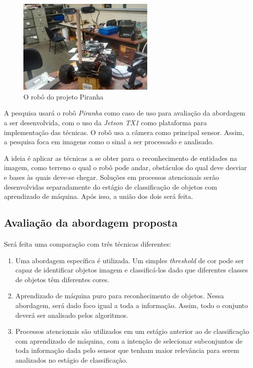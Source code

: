 \documentclass[10pt]{article}
\newcommand{\tit}[1]{\textit{#1}}
\begin{document}
\begin{figure}[H]
  		\centering
    	\includegraphics[width=0.6\textwidth]{imgs/piranha.jpg}
		\caption[9pt]{O robô do projeto Piranha}
\end{figure}

A pesquisa usará o robô \tit{Piranha} como caso de uso para
avaliação da abordagem a ser desenvolvida, com o uso da \tit{Jetson TX1} 
como plataforma para implementação das técnicas.
O robô usa a câmera como principal sensor.
Assim, a pesquisa foca em imagens como o sinal a ser processado e analisado. 

A ideia é aplicar as técnicas a se obter para o reconhecimento
de entidades na imagem, como terreno o qual o robô pode andar, obstáculos do
qual deve desviar e bases às quais deve-se chegar.
Soluções em processos atencionais serão desenvolvidas separadamente do
estágio de classificação de objetos com aprendizado de máquina. 
Após isso, a união dos dois será feita.

\subsection{Avaliação da abordagem proposta}
\paragraph{}
Será feita uma comparação com três técnicas diferentes: 
\begin{enumerate}
	\item Uma abordagem específica é utilizada.  
		Um simples \tit{threshold} de cor pode ser capaz de identificar objetos
		imagem e classificá-los dado que diferentes classes de objetos têm
		diferentes cores.
	\item Aprendizado de máquina puro para reconhecimento de objetos.
		Nessa abordagem, será dado foco igual a toda a informação. 
		Assim, todo o conjunto deverá ser analisado pelos algoritmos.
	\item Processos atencionais são utilizados em um estágio anterior ao de 
		classificação com aprendizado de máquina, com a intenção de selecionar
		subconjuntos de toda informação dada pelo sensor que tenham maior 
		relevância para serem analizados no estágio de classificação.
\end{enumerate}
\end{document}
